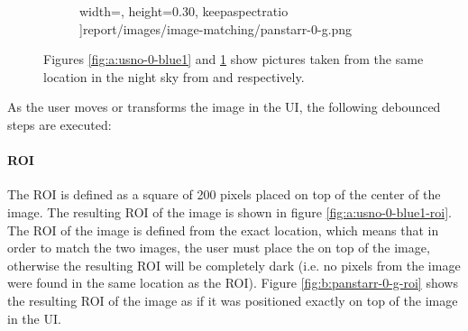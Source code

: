 \begin{figure}[H]
\begin{subfigure}{.5\textwidth}
            width=\textwidth,
            height=0.30\textheight,
            keepaspectratio
      ]{report/images/image-matching/panstarr-0-g.png}
      \caption{\panstarrs}
      \label{fig:b:panstarr-0-g}
    \end{subfigure}
    \caption{Figures \ref{fig:a:usno-0-blue1} and \ref{fig:b:panstarr-0-g} show pictures taken from the same location in the night sky from \usno and \panstarrs respectively.}
    \label{fig:mission-0}
\end{figure}

As the user moves or transforms the \panstarrs image in the UI, the following debounced steps are executed:

\paragraph{ROI} \label{paragraph:case-study:impl:roi}
The ROI is defined as a square of 200 pixels placed on top of the center of the \usno image. The resulting ROI of the \usno image is shown in figure \ref{fig:a:usno-0-blue1-roi}. The ROI of the \panstarrs image is defined from the exact location, which means that in order to match the two images, the user must place the \panstarrs on top of the \usno image, otherwise the resulting ROI will be completely dark (i.e. no pixels from the \panstarrs image were found in the same location as the \usno ROI). Figure \ref{fig:b:panstarr-0-g-roi} shows the resulting ROI of the \panstarrs image as if it was positioned exactly on top of the \usno image in the UI.

